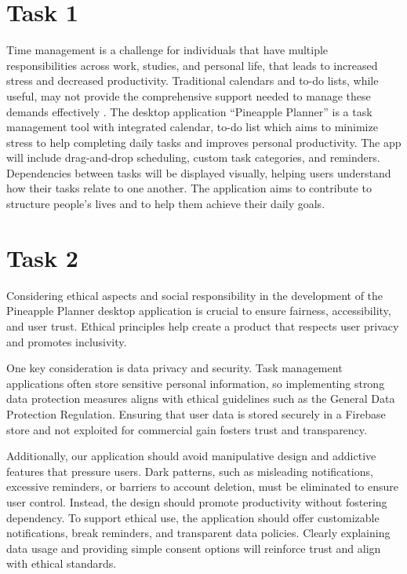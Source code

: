 \documentclass{article}
\begin{document}
\newpage

\section{Task 1}

Time management is a challenge for individuals that have multiple responsibilities across work, studies, and personal life, that leads to increased stress and decreased productivity.
Traditional calendars and to-do lists, while useful, may not provide the comprehensive support needed to manage these demands effectively \cite{bek2014study}.
The desktop application “Pineapple Planner” is a task management tool with integrated calendar, to-do list which aims to minimize stress to help completing daily tasks and improves personal productivity.
The app will include drag-and-drop scheduling, custom task categories, and reminders.
Dependencies between tasks will be displayed visually, helping users understand how their tasks relate to one another.
The application aims to contribute to structure people’s lives and to help them achieve their daily goals.


\section{Task 2}
Considering ethical aspects and social responsibility in the development of the Pineapple Planner desktop application is crucial to ensure fairness, accessibility, and user trust.
Ethical principles help create a product that respects user privacy and promotes inclusivity.

One key consideration is data privacy and security.
Task management applications often store sensitive personal information, so implementing strong data protection measures aligns with ethical guidelines such as the General Data Protection Regulation.
Ensuring that user data is stored securely in a Firebase store and not exploited for commercial gain fosters trust and transparency.
\cite{hoofnagle2019european}

Additionally, our application should avoid manipulative design and addictive features that pressure users.
Dark patterns, such as misleading notifications, excessive reminders, or barriers to account deletion, must be eliminated to ensure user control.
Instead, the design should promote productivity without fostering dependency.
To support ethical use, the application should offer customizable notifications, break reminders, and transparent data policies.
Clearly explaining data usage and providing simple consent options will reinforce trust and align with ethical standards.
\cite{montag2019addictive}
\end{document}
